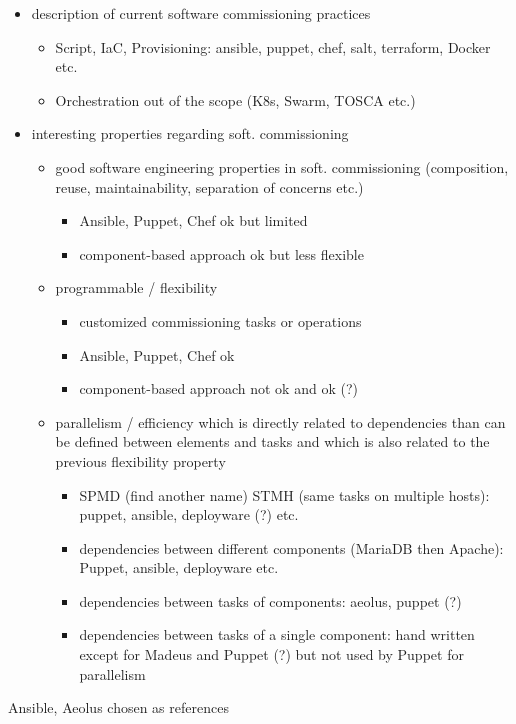 \begin{itemize}
\item description of current software commissioning practices
  \begin{itemize}
  \item Script, IaC, Provisioning: ansible, puppet, chef, salt,
    terraform, Docker etc.
  \item Orchestration out of the scope (K8s, Swarm, TOSCA etc.)
  \end{itemize}
\item interesting properties regarding soft. commissioning
  \begin{itemize}
  \item good software engineering properties in soft. commissioning
    (composition, reuse, maintainability, separation of concerns etc.)
    \begin{itemize}
    \item Ansible, Puppet, Chef ok but limited
    \item component-based approach ok but less flexible
    \end{itemize}
  \item programmable / flexibility
    \begin{itemize}
    \item customized commissioning tasks or operations
    \item Ansible, Puppet, Chef ok
    \item component-based approach not ok and ok (?)
    \end{itemize}
  \item parallelism / efficiency which is directly related to
    dependencies than can be defined between elements and tasks and
    which is also related to the previous flexibility property
    \begin{itemize}
    \item SPMD (find another name) STMH (same tasks on multiple
      hosts): puppet, ansible, deployware (?) etc.
    \item dependencies between different components (MariaDB then
      Apache): Puppet, ansible, deployware etc.
    \item dependencies between tasks of components: aeolus, puppet (?)
    \item dependencies between tasks of a single component: hand
      written except for Madeus and Puppet (?) but not used by Puppet
      for parallelism
    \end{itemize}
  \end{itemize}
\end{itemize}

Ansible, Aeolus chosen as references
  